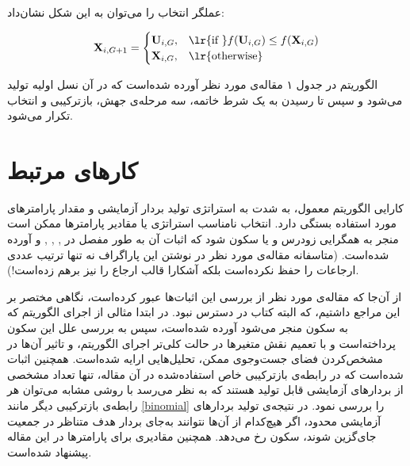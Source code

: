 \documentclass[12pt,a4paper]{article}
\theoremstyle{definition}
\theoremstyle{theorem}
\theoremstyle{definition}
\begin{document}
عملگر انتخاب را می‌توان به این شکل نشان‌داد: 

\begin{equation}
{\bf{X}}_{i, {G+1} } =
  \begin{cases}
   {\bf{U}}_{i,G} , & \text{\lr{if }} f({\bf{U}}_{i,G}) \le f({\bf{X}}_{i,G}) \\
   {\bf{X}}_{i,G} , & \text{\lr{otherwise}}
  \end{cases}
\end{equation}

الگوریتم
در جدول ۱ مقاله‌ی مورد نظر آورده شده‌است که در آن نسل اولیه تولید می‌شود و سپس تا رسیدن به یک شرط خاتمه، سه مرحله‌ی جهش، بازترکیبی و انتخاب تکرار می‌شود. 


 



\newpage
\section{کارهای مرتبط}
\label{sec:related}
کارایی الگوریتم 
معمول، به شدت به استراتژی تولید بردار آزمایشی و مقدار پارامترهای مورد استفاده بستگی دارد. انتخاب نامناسب استراتژی یا مقادیر پارامترها ممکن است منجر به همگرایی زودرس و یا سکون شود که اثبات آن به طور مفصل در 
\cite{demon1} , \cite{demon2} , \cite{demon3} , \cite{demon4}
 و 
 \cite{demon5} 
 آورده شده‌است. (متاسفانه مقاله‌ی مورد نظر در نوشتن این پاراگراف نه تنها ترتیب عددی ارجاعات را حفظ نکرده‌است بلکه آشکارا قالب ارجاع را نیز برهم زده‌است!).
 
از آن‌جا که مقاله‌ی مورد نظر از بررسی این اثبات‌ها عبور کرده‌است، نگاهی مختصر بر این مراجع داشتیم، که البته کتاب \cite{demon1} در دسترس نبود. در \cite{demon2} ابتدا مثالی از اجرای الگوریتم که به سکون منجر می‌شود آورده شده‌است، سپس به بررسی علل این سکون پرداخته‌است و با تعمیم نقش متغیرها در حالت کلی‌تر اجرای الگوریتم، و تاثیر آن‌ها در مشخص‌کردن فضای جست‌وجوی ممکن، تحلیل‌هایی ارایه شده‌است. همچنین اثبات شده‌است که در رابطه‌ی بازترکیبی خاص استفاده‌شده در آن مقاله، تنها تعداد مشخصی از بردارهای آزمایشی قابل تولید هستند که به نظر می‌رسد با روشی مشابه می‌توان هر رابطه‌ی بازترکیبی دیگر مانند \ref{binomial} را بررسی نمود. در نتیجه‌ی تولید بردارهای آزمایشی محدود، اگر هیچ‌کدام از آن‌ها نتوانند به‌جای بردار هدف متناظر در جمعیت جای‌گزین شوند، سکون رخ می‌دهد. همچنین مقادیری برای پارامترها در این مقاله پیشنهاد شده‌است.
\end{document}
